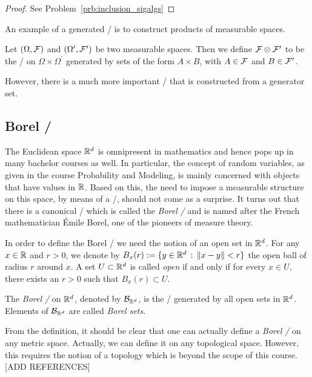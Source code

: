 \begin{proof}
See Problem~\ref{prb:inclusion_sigalgs}
\end{proof}

An example of a generated \sigalg/ is to construct products of measurable spaces.

\begin{definition}\label{def:product_sigalg}
Let $(\Omega, \mathcal F)$ and $(\Omega^\prime, \mathcal F^\prime)$ be two measurable spaces. Then we define $\mathcal F \otimes \mathcal F^\prime$ to be the \sigalg/ on $\Omega \times \Omega^\prime$ generated by sets of the form $A \times B$, with $A \in \mathcal F$ and $B \in \mathcal F^\prime$.
\end{definition}

However, there is a much more important \sigalg/ that is constructed from a generator set.

\subsection{Borel \sigalg/}

The Euclidean space $\mathbb R^d$ is omnipresent in mathematics and hence pops up in many bachelor courses as well. In particular, the concept of random variables, as given in the course Probability and Modeling, is mainly concerned with objects that have values in $\mathbb R$. Based on this, the need to impose a measurable structure on this space, by means of a \sigalg/, should not come as a surprise. It turns out that there is a canonical \sigalg/ which is called the \emph{Borel \sigalg/} and is named after the French mathematician \'{E}mile Borel, one of the pioneers of measure theory.

In order to define the Borel \sigalg/ we need the notion of an open set in $\mathbb R^d$. For any $x \in \mathbb R$ and $r >0$, we denote by $B_x(r) := \{y \in \mathbb R^d \, : \, \|x-y\|<r\}$ the open ball of radius $r$ around $x$. A set $U \subset \mathbb R^d$ is called \emph{open} if and only if for every $x \in U$, there exists an $r > 0$ such that $B_x(r) \subset U$.

\begin{definition}
The \emph{Borel \sigalg/} on $\mathbb R^d$, denoted by $\mathcal B_{\mathbb R^d}$, is the \sigalg/ generated by all open sets in $\mathbb R^d$. Elements of $\mathcal B_{\mathbb R^d}$ are called \emph{Borel sets}.
\end{definition}

\begin{remark}
From the definition, it should be clear that one can actually define a \emph{Borel \sigalg/} on any metric space. Actually, we can define it on any topological space. However, this requires the notion of a topology which is beyond the scope of this course. [ADD REFERENCES]
\end{remark}

